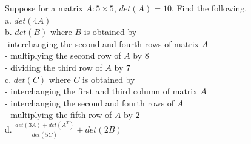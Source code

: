 \documentclass{ximera}
\author{Parisa Fatheddin}
\begin{document}
\begin{exercise}


Suppose for a matrix $A: 5\times 5$, $det(A)=10$. Find the following. \\

a. $det(4A)$\\

b. $det(B)$ where $B$ is obtained by \\
-interchanging the second and fourth rows of matrix $A$\\
- multiplying the second row of $A$ by $8$\\
- dividing the third row of $A$ by $7$\\

c. $det(C)$ where $C$ is obtained by\\
- interchanging the first and third column of matrix $A$\\
- interchanging the second and fourth rows of $A$\\
- multiplying the fifth row of $A$ by $2$\\

d. $\frac{det(3A) + det (A^T)}{det(5C)} + det(2B)$ 














\end{exercise}
\end{document}
